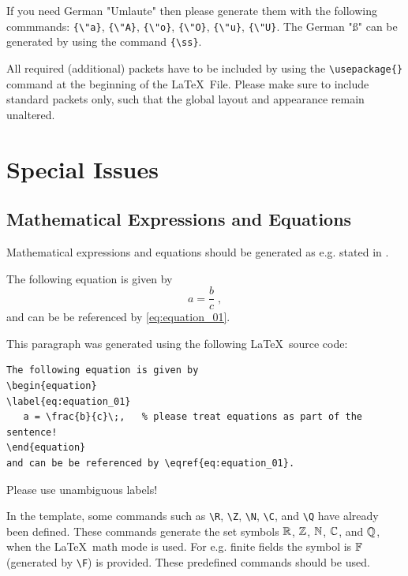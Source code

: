 \documentclass[12pt,a4paper,notitlepage,twoside,headsepline]{scrartcl}
\begin{document}
If you need German "Umlaute" then please generate them with the following commmands: \verb|{\"a}|, \verb|{\"A}|, \verb|{\"o}|, \verb|{\"O}|, \verb|{\"u}|, \verb|{\"U}|. The German "{\ss}" can be generated by using the command \verb|{\ss}|.

All required (additional) packets have to be included by using the \verb|\usepackage{}| command at the beginning of the \LaTeX\ File. Please make sure to include standard packets only, such that the global layout and appearance remain unaltered.

\section{Special Issues}

\subsection{Mathematical Expressions and Equations}

Mathematical expressions and equations should be generated as e.g. stated in \cite[Kapitel 5]{Kopka:1}. 

The following equation is given by
\begin{equation}
\label{eq:equation_01}
   a = \frac{b}{c}\;,	%
\end{equation}
and can be be referenced by \eqref{eq:equation_01}.

This paragraph was generated using the following \LaTeX\ source code:
\begin{verbatim}
The following equation is given by
\begin{equation}
\label{eq:equation_01}
   a = \frac{b}{c}\;,	% please treat equations as part of the sentence!
\end{equation}
and can be be referenced by \eqref{eq:equation_01}.
\end{verbatim}

Please use unambiguous labels!

In the template, some commands such as \verb|\R|, \verb|\Z|, \verb|\N|, \verb|\C|, and \verb|\Q| have already been defined. These commands generate the set symbols $\mathbb{R}$, $\mathbb{Z}$, $\mathbb{N}$, $\mathbb{C}$, and $\mathbb{Q}$, when the \LaTeX\ math mode is used. For  e.g. finite fields the symbol is $\mathbb{F}$ (generated by \verb+\F+) is provided. These predefined commands should be used.
\end{document}

